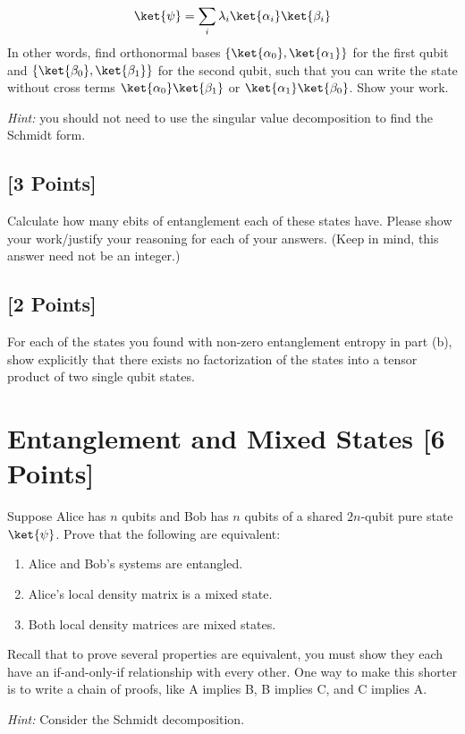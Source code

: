 \documentclass[11pt]{article}
\begin{document}
\[
\ket{\psi} = \sum_{i} \lambda_{i} \ket{\alpha_i}\ket{\beta_i}
\]
In other words, find orthonormal bases $\{\ket{\alpha_0},\ket{\alpha_1}\}$ for the first qubit and $\{\ket{\beta_0},\ket{\beta_1}\}$ for the second qubit, such that you can write the state without cross terms $\ket{\alpha_0}\ket{\beta_1}$ or $\ket{\alpha_1}\ket{\beta_0}$.
Show your work.

\noindent \textit{Hint:} you should not need to use the singular value decomposition to find the Schmidt form.


\subsection{[3 Points]} Calculate how many ebits of entanglement each of these states have. Please show your work/justify your reasoning for each of your answers. (Keep in mind, this answer need not be an integer.)


\subsection{[2 Points]} For each of the states you found with non-zero entanglement entropy in part (b), show explicitly that there exists no factorization of the states into a tensor product of two single qubit states.


\section{Entanglement and Mixed States [6 Points]}   Suppose Alice has $n$ qubits and Bob has $n$ qubits of a shared $2n$-qubit pure state $\ket{\psi}$. Prove that the following are equivalent:
\begin{enumerate}[label=\roman*.]
	\item Alice and Bob's systems are entangled.
	\item Alice's local density matrix is a mixed state.
	\item Both local density matrices are mixed states.
\end{enumerate}

\noindent Recall that to prove several properties are equivalent, you must show they each have an if-and-only-if relationship with every other. One way to make this shorter is to write a chain of proofs, like A implies B, B implies C, and C implies A.

\noindent \textit{Hint:} Consider the Schmidt decomposition. 
\end{document}
